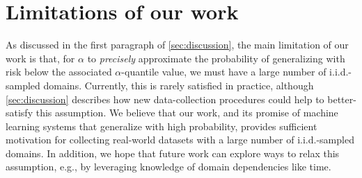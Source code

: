\documentclass{article}
\begin{document}
\newpage
\section{Limitations of our work}\label{app:limitations}
As discussed in the first paragraph of \cref{sec:discussion}, the main limitation of our work is that, for $\alpha$ to \textit{precisely} approximate the probability of generalizing with risk below the associated $\alpha$-quantile value, we must have a large number of i.i.d.-sampled domains. Currently, this is rarely satisfied in practice, although \cref{sec:discussion} describes how new data-collection procedures could help to better-satisfy this assumption. We believe that our work, and its promise of machine learning systems that generalize with high probability, provides sufficient motivation for collecting real-world datasets with a large number of i.i.d.-sampled domains. In addition, we hope that future work can explore ways to relax this assumption, e.g., by leveraging knowledge of domain dependencies like time.
%
%
%
%
%
%
%
%
%
%
%
%
%
%
%
%
%
%
%
%
%
%
%
%
%
%
%
%
%
%
%
%
%
%
%
%
%
\end{document}
